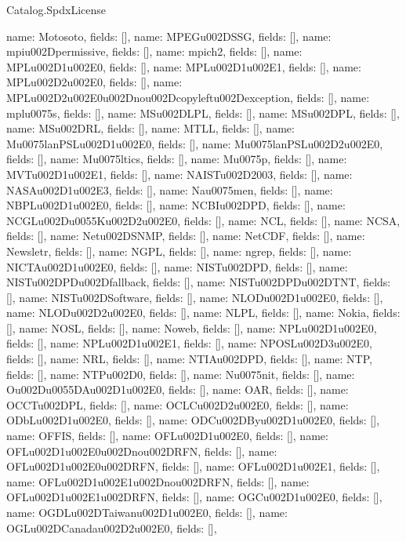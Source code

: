 \begin{lexlean}{Catalog.SpdxLicense}
\begin{semanticmodule}
{    {name: Motosoto, fields: []},
    {name: MPEGu002DSSG, fields: []},
    {name: mpiu002Dpermissive, fields: []},
    {name: mpich2, fields: []},
    {name: MPLu002D1u002E0, fields: []},
    {name: MPLu002D1u002E1, fields: []},
    {name: MPLu002D2u002E0, fields: []},
    {name: MPLu002D2u002E0u002Dnou002Dcopyleftu002Dexception, fields: []},
    {name: mplu0075s, fields: []},
    {name: MSu002DLPL, fields: []},
    {name: MSu002DPL, fields: []},
    {name: MSu002DRL, fields: []},
    {name: MTLL, fields: []},
    {name: Mu0075lanPSLu002D1u002E0, fields: []},
    {name: Mu0075lanPSLu002D2u002E0, fields: []},
    {name: Mu0075ltics, fields: []},
    {name: Mu0075p, fields: []},
    {name: MVTu002D1u002E1, fields: []},
    {name: NAISTu002D2003, fields: []},
    {name: NASAu002D1u002E3, fields: []},
    {name: Nau0075men, fields: []},
    {name: NBPLu002D1u002E0, fields: []},
    {name: NCBIu002DPD, fields: []},
    {name: NCGLu002Du0055Ku002D2u002E0, fields: []},
    {name: NCL, fields: []},
    {name: NCSA, fields: []},
    {name: Netu002DSNMP, fields: []},
    {name: NetCDF, fields: []},
    {name: Newsletr, fields: []},
    {name: NGPL, fields: []},
    {name: ngrep, fields: []},
    {name: NICTAu002D1u002E0, fields: []},
    {name: NISTu002DPD, fields: []},
    {name: NISTu002DPDu002Dfallback, fields: []},
    {name: NISTu002DPDu002DTNT, fields: []},
    {name: NISTu002DSoftware, fields: []},
    {name: NLODu002D1u002E0, fields: []},
    {name: NLODu002D2u002E0, fields: []},
    {name: NLPL, fields: []},
    {name: Nokia, fields: []},
    {name: NOSL, fields: []},
    {name: Noweb, fields: []},
    {name: NPLu002D1u002E0, fields: []},
    {name: NPLu002D1u002E1, fields: []},
    {name: NPOSLu002D3u002E0, fields: []},
    {name: NRL, fields: []},
    {name: NTIAu002DPD, fields: []},
    {name: NTP, fields: []},
    {name: NTPu002D0, fields: []},
    {name: Nu0075nit, fields: []},
    {name: Ou002Du0055DAu002D1u002E0, fields: []},
    {name: OAR, fields: []},
    {name: OCCTu002DPL, fields: []},
    {name: OCLCu002D2u002E0, fields: []},
    {name: ODbLu002D1u002E0, fields: []},
    {name: ODCu002DByu002D1u002E0, fields: []},
    {name: OFFIS, fields: []},
    {name: OFLu002D1u002E0, fields: []},
    {name: OFLu002D1u002E0u002Dnou002DRFN, fields: []},
    {name: OFLu002D1u002E0u002DRFN, fields: []},
    {name: OFLu002D1u002E1, fields: []},
    {name: OFLu002D1u002E1u002Dnou002DRFN, fields: []},
    {name: OFLu002D1u002E1u002DRFN, fields: []},
    {name: OGCu002D1u002E0, fields: []},
    {name: OGDLu002DTaiwanu002D1u002E0, fields: []},
    {name: OGLu002DCanadau002D2u002E0, fields: []},
}
\end{semanticmodule}
\end{lexlean}
